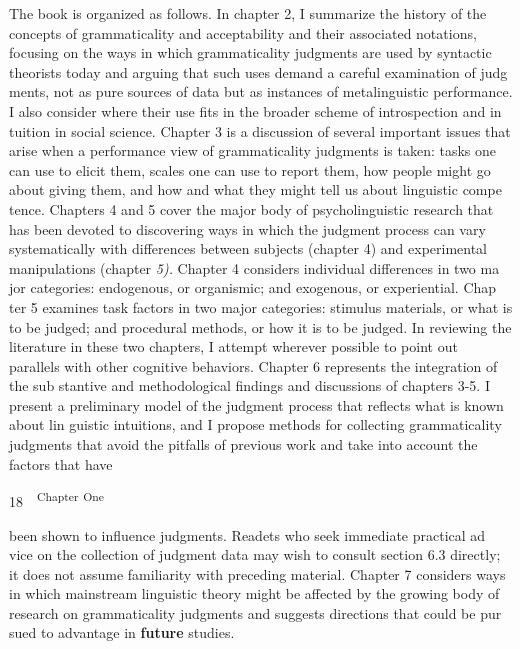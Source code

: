 \begin{styleTextbody}
The book is organized as follows. In chapter 2, I summarize the history of the concepts of grammaticality and acceptability and their associated notations, focusing on the ways in which grammaticality judgments are used by syntactic theorists today and arguing that such uses demand a careful examination of judg\- ments, not as pure sources of data but as instances of metalinguistic performance. I also consider where their use fits in the broader scheme of introspection and in\- tuition in social science. Chapter 3 is a discussion of several important issues that arise when a performance view of grammaticality judgments is taken: tasks one can use to elicit them, scales one can use to report them, how people might go about giving them, and how and what they might tell us about linguistic compe\- tence. Chapters 4 and 5 cover the major body of psycholinguistic research that has been devoted to discovering ways in which the judgment process can vary systematically with differences between subjects (chapter 4) and experimental manipulations (chapter \textit{5).}\textit{ }Chapter 4 considers individual differences in two ma\- jor categories: endogenous, or organismic; and exogenous, or experiential. Chap\- ter 5 examines task factors in two major categories: stimulus materials, or what is to be judged; and procedural methods, or how it is to be judged. In reviewing the literature in these two chapters, I attempt wherever possible to point out parallels with other cognitive behaviors. Chapter 6 represents the integration of the sub\- stantive and methodological findings and discussions of chapters 3-5. I present a preliminary model of the judgment process that reflects what is known about lin\- guistic intuitions, and I propose methods for collecting grammaticality judgments that avoid the pitfalls of previous work and take into account the factors that have
\end{styleTextbody}


\clearpage\setcounter{page}{1}\begin{styleStandard}
18\ \ \textsuperscript{Chapter}\textsuperscript{ }\textsuperscript{One}
\end{styleStandard}


\begin{styleTextbody}
been shown to influence judgments. Readets who seek immediate practical ad\- vice on the collection of judgment data may wish to consult section 6.3 directly; it does not assume familiarity with preceding material. Chapter 7 considers ways in which mainstream linguistic theory might be affected by the growing body of research on grammaticality judgments and suggests directions that could be pur\- sued to advantage in \textbf{future}\textbf{ }studies.
\end{styleTextbody}


